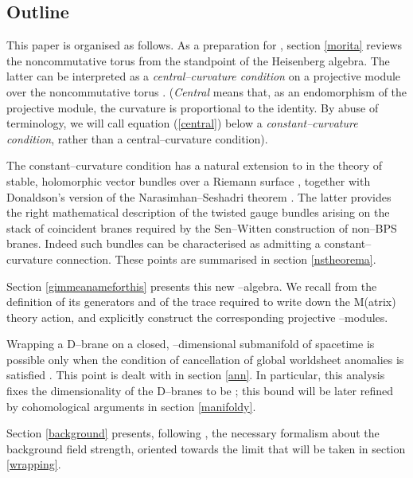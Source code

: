 \documentclass[a4paper,a4paper]{article}
\begin{document}
\subsection{Outline}\label{outline}  

This paper is organised as follows.  As a preparation for \coordHE{},
section \ref{morita} reviews the noncommutative torus from the 
standpoint of the Heisenberg algebra. The latter can be interpreted 
as a {\it central--curvature condition} on a projective module over 
the noncommutative torus \cite{SCHWARZ, KONECHNYSCHWARZ}.
({\it Central} means that, as an endomorphism of the projective module, 
the curvature is proportional to the identity. By abuse of terminology, 
we will call equation (\ref{central}) below a {\it constant--curvature condition}, 
rather than a central--curvature condition).

The constant--curvature condition has a natural extension to \coordHE{} 
in the theory of stable, holomorphic vector bundles over a Riemann surface 
\myHighlight{$\Sigma$}\coordHE{}, together with Donaldson's version \cite{DONALDSON} 
of the Narasimhan--Seshadri theorem \cite{NASE}. 
The latter provides the right mathematical description of the twisted 
gauge bundles arising on the stack of coincident branes required by the 
Sen--Witten construction of non--BPS branes. Indeed such bundles 
can be characterised as admitting a constant--curvature connection.  
These points are summarised in section \ref{nstheorema}.  

Section \ref{gimmeanameforthis} presents this new \coordHE{}--algebra. 
We recall from \cite{PROCEEDINGS} the definition of its generators and 
of the trace required to write down the M(atrix) theory action, 
and explicitly construct the corresponding projective \coordHE{}--modules.  

Wrapping a D\coordHE{}--brane on a closed, \coordHE{}--dimensional submanifold of spacetime 
is possible only when the condition of cancellation of global worldsheet anomalies 
is satisfied \cite{WITTENDK, BARYONS, FREEDWITTEN, KAPUSTIN}. This point is dealt 
with in section \ref{ann}. In particular, this analysis fixes the  
dimensionality of the D\coordHE{}--branes to be \coordHE{}; this bound will be 
later refined by cohomological arguments in section \ref{manifoldy}.

Section \ref{background} presents, following \cite{BOUWMATHAI, KAPUSTIN},
the necessary formalism about the background field strength, oriented towards 
the limit \coordHE{} that will be taken in section \ref{wrapping}. 
\end{document}
